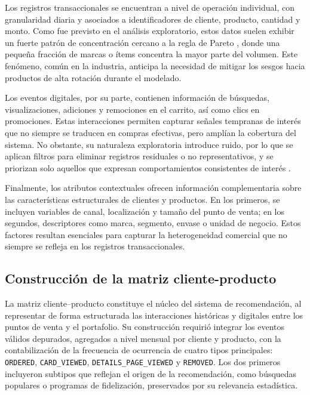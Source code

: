 Los registros transaccionales se encuentran a nivel de operación individual, con granularidad diaria y asociados a identificadores de cliente, producto, cantidad y monto. Como fue previsto en el análisis exploratorio, estos datos suelen exhibir un fuerte patrón de concentración cercano a la regla de Pareto \cite{BOOK:Koch1998}, donde una pequeña fracción de marcas o ítems concentra la mayor parte del volumen. Este fenómeno, común en la industria, anticipa la necesidad de mitigar los sesgos hacia productos de alta rotación durante el modelado.

Los eventos digitales, por su parte, contienen información de búsquedas, visualizaciones, adiciones y remociones en el carrito, así como clics en promociones. Estas interacciones permiten capturar señales tempranas de interés que no siempre se traducen en compras efectivas, pero amplían la cobertura del sistema. No obstante, su naturaleza exploratoria introduce ruido, por lo que se aplican filtros para eliminar registros residuales o no representativos, y se priorizan solo aquellos que expresan comportamientos consistentes de interés \cite{BOOK:Ricci2015,ARTICLE:Zhang2019}.

Finalmente, los atributos contextuales ofrecen información complementaria sobre las características estructurales de clientes y productos. En los primeros, se incluyen variables de canal, localización y tamaño del punto de venta; en los segundos, descriptores como marca, segmento, envase o unidad de negocio. Estos factores resultan esenciales para capturar la heterogeneidad comercial que no siempre se refleja en los registros transaccionales.

\subsection{Construcción de la matriz cliente-producto}

La matriz cliente–producto constituye el núcleo del sistema de recomendación, al representar de forma estructurada las interacciones históricas y digitales entre los puntos de venta y el portafolio. Su construcción requirió integrar los eventos válidos depurados, agregados a nivel mensual por cliente y producto, con la contabilización de la frecuencia de ocurrencia de cuatro tipos principales: \texttt{ORDERED}, \texttt{CARD\_VIEWED}, \texttt{DETAILS\_PAGE\_VIEWED} y \texttt{REMOVED}. Los dos primeros incluyeron subtipos que reflejan el origen de la recomendación, como búsquedas populares o programas de fidelización, preservados por su relevancia estadística.

